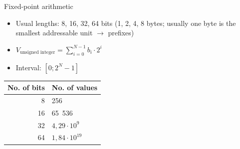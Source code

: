 \documentclass[usenames,dvipsnames,aspectratio=169]{beamer}
\begin{document}
\begin{frame}{Fixed-point arithmetic}
  \normalsize{
    \begin{itemize}
      \item Usual lengths: 8, 16, 32, 64 bits (1, 2, 4, 8 bytes; usually one byte is the smallest addressable unit $\to$ prefixes)
      \item $V_{\textrm{unsigned integer}} =
\sum_{i=0}^{N-1}b_i\cdot2^i$
      \item Interval: $[0; 2^N-1]$
    \end{itemize}
    \begin{center}
      \begin{tabular}{r|l}
      No. of bits & No. of values\\ \hline
      8 & 256\\
      16 & 65\ 536\\
      32 & $4,29\cdot10^9$\\
      64 & $1,84\cdot10^{19}$
    \end{tabular}
    \end{center}
  }
\end{frame}
\end{document}
